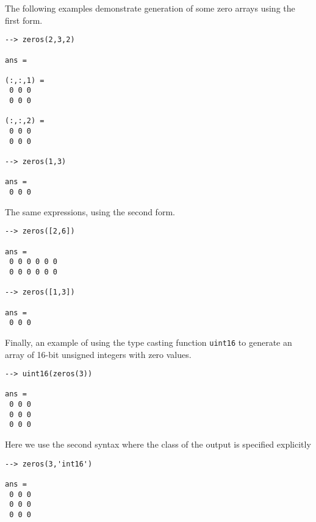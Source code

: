 The following examples demonstrate generation of some zero arrays 
using the first form.
\begin{verbatim}
--> zeros(2,3,2)

ans = 

(:,:,1) = 
 0 0 0 
 0 0 0 

(:,:,2) = 
 0 0 0 
 0 0 0 

--> zeros(1,3)

ans = 
 0 0 0 
\end{verbatim}
The same expressions, using the second form.
\begin{verbatim}
--> zeros([2,6])

ans = 
 0 0 0 0 0 0 
 0 0 0 0 0 0 

--> zeros([1,3])

ans = 
 0 0 0 
\end{verbatim}
Finally, an example of using the type casting function \verb|uint16| to generate an array of 16-bit unsigned integers with zero values.
\begin{verbatim}
--> uint16(zeros(3))

ans = 
 0 0 0 
 0 0 0 
 0 0 0 
\end{verbatim}
Here we use the second syntax where the class of the output is specified 
explicitly
\begin{verbatim}
--> zeros(3,'int16')

ans = 
 0 0 0 
 0 0 0 
 0 0 0 
\end{verbatim}
